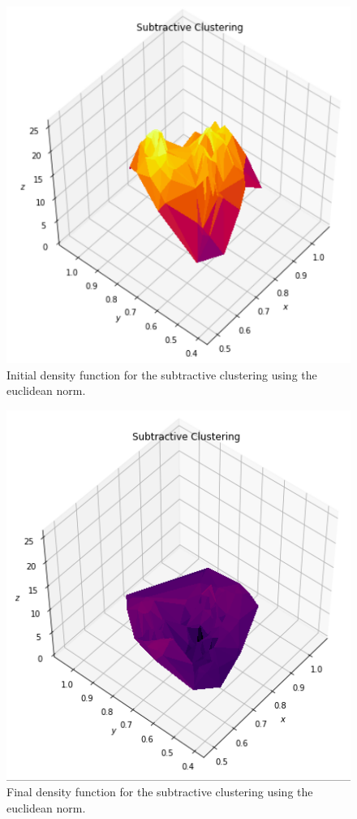 \documentclass[conference]{IEEEtran}
\begin{document}
\begin{itemize}
\begin{figure}[ht]
    \includegraphics[scale = 0.45]{figures/iris/subtractive-i.png}
    \caption{Initial density function for the subtractive clustering using the euclidean norm.}
    \label{fig:sub-i-iris}
\end{figure}

\begin{figure}[ht]
    \centering
    \includegraphics[scale = 0.5]{figures/iris/subtractive-f.png}
    \caption{Final density function for the subtractive clustering using the euclidean norm.}
    \label{fig:sub-f-iris}
\end{figure}


\end{itemize}
\end{document}
